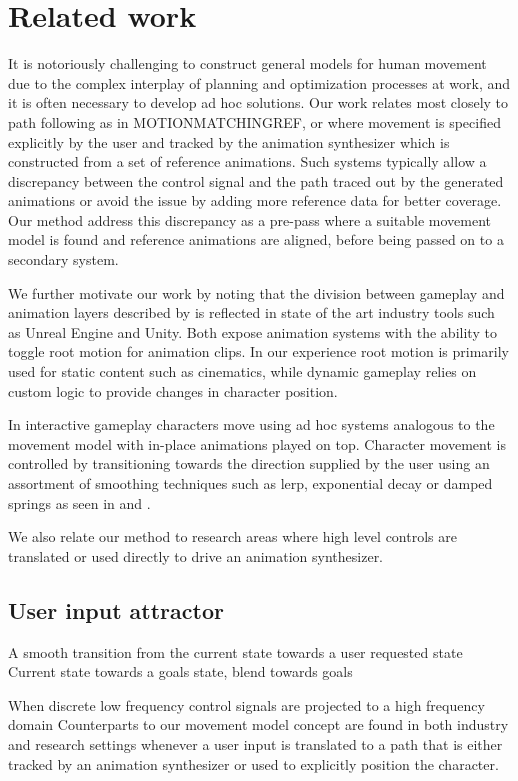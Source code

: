 \section{Related work}
It is notoriously challenging to construct general models for human movement due to the complex interplay of planning and optimization processes at work, and it is often necessary to develop ad hoc solutions. Our work relates most closely to path following as in MOTIONMATCHINGREF, \citep{holden.16} or \citep{startke20} where movement is specified explicitly by the user and tracked by the animation synthesizer which is constructed from a set of reference animations. Such systems typically allow a discrepancy between the control signal and the path traced out by the generated animations or avoid the issue by adding more reference data for better coverage. Our method address this discrepancy as a pre-pass where a suitable movement model is found and reference animations are aligned, before being passed on to a secondary system.  

We further motivate our work by noting that the division between gameplay and animation layers described by \citep{holden18} is reflected in state of the art industry tools such as Unreal Engine and Unity. Both expose animation systems with the ability to toggle root motion for animation clips. In our experience root motion is primarily used for static content such as cinematics, while dynamic gameplay relies on custom logic to provide changes in character position.



In interactive gameplay characters move using ad hoc systems analogous to the movement model with in-place animations played on top. Character movement is controlled by transitioning towards the direction supplied by the user using an assortment of smoothing techniques such as lerp, exponential decay or damped springs as seen in \citep{buttner20} and \citep{holden21}.

We also relate our method to research areas where high level controls are translated or used directly to drive an animation synthesizer. 

\subsection{User input attractor}
A smooth transition from the current state towards a user requested state   Current state towards a goals state, blend towards goals

When discrete low frequency control signals are projected to a high frequency domain 
Counterparts to our movement model concept are found in both industry and research settings whenever a user input is translated to a path that is either tracked by an animation synthesizer or used to explicitly position the character.


